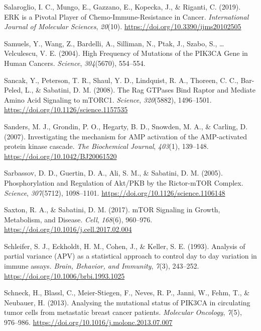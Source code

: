 \documentclass[12pt,openany]{book}
\begin{document}
\hypertarget{ref-Salaroglio2019}{}
Salaroglio, I. C., Mungo, E., Gazzano, E., Kopecka, J., \& Riganti, C.
(2019). ERK is a Pivotal Player of Chemo-Immune-Resistance in Cancer.
\emph{International Journal of Molecular Sciences}, \emph{20}(10).
\url{https://doi.org/10.3390/ijms20102505}

\hypertarget{ref-Samuels2004}{}
Samuels, Y., Wang, Z., Bardelli, A., Silliman, N., Ptak, J., Szabo, S.,
\ldots{} Velculescu, V. E. (2004). High Frequency of Mutations of the
PIK3CA Gene in Human Cancers. \emph{Science}, \emph{304}(5670),
554--554.

\hypertarget{ref-Sancak2008}{}
Sancak, Y., Peterson, T. R., Shaul, Y. D., Lindquist, R. A., Thoreen, C.
C., Bar-Peled, L., \& Sabatini, D. M. (2008). The Rag GTPases Bind
Raptor and Mediate Amino Acid Signaling to mTORC1. \emph{Science},
\emph{320}(5882), 1496--1501.
\url{https://doi.org/10.1126/science.1157535}

\hypertarget{ref-Sanders2007}{}
Sanders, M. J., Grondin, P. O., Hegarty, B. D., Snowden, M. A., \&
Carling, D. (2007). Investigating the mechanism for AMP activation of
the AMP-activated protein kinase cascade. \emph{The Biochemical
Journal}, \emph{403}(1), 139--148.
\url{https://doi.org/10.1042/BJ20061520}

\hypertarget{ref-Sarbassov2005}{}
Sarbassov, D. D., Guertin, D. A., Ali, S. M., \& Sabatini, D. M. (2005).
Phosphorylation and Regulation of Akt/PKB by the Rictor-mTOR Complex.
\emph{Science}, \emph{307}(5712), 1098--1101.
\url{https://doi.org/10.1126/science.1106148}

\hypertarget{ref-Saxton2017}{}
Saxton, R. A., \& Sabatini, D. M. (2017). mTOR Signaling in Growth,
Metabolism, and Disease. \emph{Cell}, \emph{168}(6), 960--976.
\url{https://doi.org/10.1016/j.cell.2017.02.004}

\hypertarget{ref-Schleifer1993}{}
Schleifer, S. J., Eckholdt, H. M., Cohen, J., \& Keller, S. E. (1993).
Analysis of partial variance (APV) as a statistical approach to control
day to day variation in immune assays. \emph{Brain, Behavior, and
Immunity}, \emph{7}(3), 243--252.
\url{https://doi.org/10.1006/brbi.1993.1025}

\hypertarget{ref-Schneck2013}{}
Schneck, H., Blassl, C., Meier-Stiegen, F., Neves, R. P., Janni, W.,
Fehm, T., \& Neubauer, H. (2013). Analysing the mutational status of
PIK3CA in circulating tumor cells from metastatic breast cancer
patients. \emph{Molecular Oncology}, \emph{7}(5), 976--986.
\url{https://doi.org/10.1016/j.molonc.2013.07.007}
\end{document}
